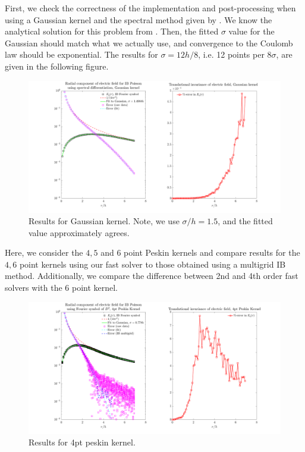 First, we check the correctness of the implementation and post-processing when using a Gaussian kernel and the spectral method given by . We know the analytical solution for this problem from . Then, the fitted $\sigma$ value for the Gaussian should match what we actually use, and convergence to the Coulomb law should be exponential. The results for $\sigma = 12h/8$, i.e. 12 points per $8\sigma$, are given in the following figure.
\begin{figure}[H]
	\centering
	\includegraphics[width=1\columnwidth]{../Figures/Gaussian_L32_N128.png}
	\caption{Results for Gaussian kernel. Note, we use $\sigma/h = 1.5$, and the fitted value approximately agrees.}\label{gauss}
\end{figure}
\newpage
{}
Here, we consider the $4,5$ and $6$ point Peskin kernels and compare results for the $4,6$ point kernels using our fast solver to those obtained using a multigrid IB method. Additionally, we compare the difference between 2nd and 4th order fast solvers with the $6$ point kernel.
\begin{figure}[H]
	\centering
	\includegraphics[width=1\columnwidth]{../Figures/4pt_peskin.png}
	\caption{Results for 4pt peskin kernel.}\label{pesk4}
\end{figure}
